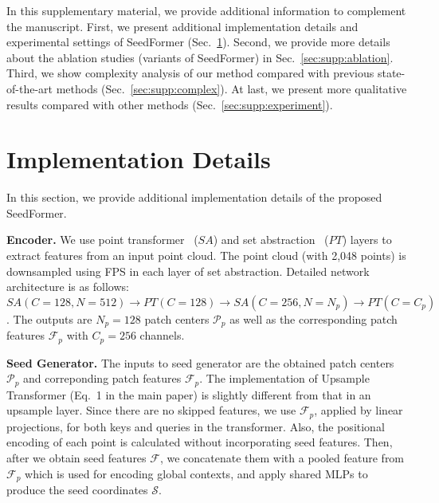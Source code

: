 \newpage
\renewcommand\thesection{\Alph{section}}
\renewcommand\thesubsection{\Alph{subsection}}

\setcounter{section}{0}


In this supplementary material, we provide additional information to complement the manuscript. First, we present additional implementation details and experimental settings of SeedFormer (Sec.~\ref{sec:supp:detail}). Second, we provide more details about the ablation studies (variants of SeedFormer) in Sec.~\ref{sec:supp:ablation}. Third, we show complexity analysis of our method compared with previous state-of-the-art methods (Sec.~\ref{sec:supp:complex}). At last, we present more qualitative results compared with other methods (Sec.~\ref{sec:supp:experiment}).

\section{Implementation Details}
\label{sec:supp:detail}
In this section, we provide additional implementation details of the proposed SeedFormer.

\vspace{5pt}
\noindent\textbf{Encoder.} We use point transformer~\cite{zhao2021point} ($SA$) and set abstraction~\cite{qi2017pointnet++} ($PT$) layers to extract features from an input point cloud. The point cloud (with 2,048 points) is downsampled using FPS in each layer of set abstraction. Detailed network architecture is as follows: $SA(C=128, N=512) \rightarrow PT(C=128) \rightarrow SA(C=256, N=N_p) \rightarrow PT(C=C_p)$. The outputs are $N_p=128$ patch centers $\mathcal{P}_p$ as well as the corresponding patch features $\mathcal{F}_p$ with $C_p = 256$ channels. 

\vspace{5pt}
\noindent\textbf{Seed Generator.} The inputs to seed generator are the obtained patch centers $\mathcal{P}_p$ and correponding patch features $\mathcal{F}_p$. 
The implementation of Upsample Transformer (Eq.~1 in the main paper) is slightly different from that in an upsample layer.
Since there are no skipped features, we use $\mathcal{F}_p$, applied by linear projections, for both keys and queries in the transformer. Also, the positional encoding of each point is calculated without incorporating seed features. Then, after we obtain seed features $\mathcal{F}$, we concatenate them with a pooled feature from $\mathcal{F}_p$ which is used for encoding global contexts, and apply shared MLPs to produce the seed coordinates $\mathcal{S}$.

